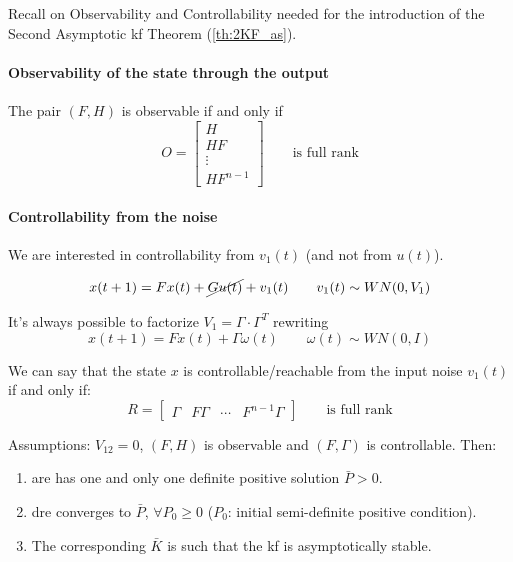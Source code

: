 \begin{recall}
    Recall on Observability and Controllability needed for the introduction of the Second Asymptotic \gls{kf} Theorem (\ref{th:2KF_as}). 

    \paragraph{Observability of the state through the output} 

    The pair $(F, H)$ is observable if and only if
    \[
        O = \begin{bmatrix}
            H \\
            HF \\
            \vdots \\
            HF^{n-1}
        \end{bmatrix}
        \qquad
        \text{is full rank}
    \]

    \paragraph{Controllability from the noise} 

    We are interested in controllability from $v_1(t)$ (and not from $u(t)$).

    \begin{align*}
        x(t+1) = Fx(t) + \cancel{Gu(t)} + v_1(t) \qquad v_1(t) \sim WN(0, V_1)
    \end{align*}


    It's always possible to factorize $V_1 = \Gamma\cdot\Gamma^T$ rewriting
    \[
        x(t+1) = Fx(t) + \Gamma\omega(t) \qquad \omega(t) \sim WN(0, I)
    \]

    We can say that the state $x$ is controllable/reachable from the input noise $v_1(t)$ if and only if:
    \[
        R = \begin{bmatrix}
            \Gamma & F\Gamma & \cdots & F^{n-1}\Gamma
        \end{bmatrix}
        \qquad
        \text{is full rank}
    \]
\end{recall}


\begin{theorem}\label{th:2KF_as}
    Assumptions: $V_{12} = 0$, $(F, H)$ is observable and $(F, \Gamma)$ is controllable.
    Then:
    \begin{enumerate}
        \item \gls{are} has one and only one definite positive solution $\bar{P} > 0$.
        \item \gls{dre} converges to $\bar{P}$, $\forall P_0 \ge 0$ ($P_0$: initial semi-definite positive condition).
        \item The corresponding $\bar{K}$ is such that the \gls{kf} is asymptotically stable.
    \end{enumerate}
\end{theorem}

